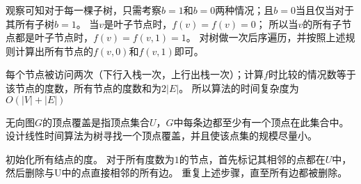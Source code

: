 \begin{questions}
\begin{solution}
        观察可知对于每一棵子树，只需考察$b=1$和$b=0$两种情况；且$b=0$当且仅当对于其所有子树$b=1$。
        当$v$是叶子节点时，$f(v) = f(v) = 0$；
        所以当$v$的所有子节点都是叶子节点时，$f(v) = f(v, 1) = 1$。
        对树做一次后序遍历，并按照上述规则计算出所有节点的$f(v,0)和f(v,1)$即可。

        每个节点被访问两次（下行入栈一次，上行出栈一次）；计算$f$时比较的情况数等于该节点的度数，所有节点的度数和为$2|E|$。
        所以算法的时间复杂度为$O(|V|+|E|)$
    \end{solution}

    \question 无向图$G$的顶点覆盖是指顶点集合$U$，$G$中每条边都至少有一个顶点在此集合中。
    设计线性时间算法为树寻找一个顶点覆盖，并且使该点集的规模尽量小。

    \begin{solution}
        初始化所有结点的度。
        对于所有度数为$1$的节点，首先标记其相邻的点都在$U$中，然后删除与U中的点直接相邻的所有边。
        重复上述步骤，直至所有边都被删除。

    \end{solution}

\end{questions}
